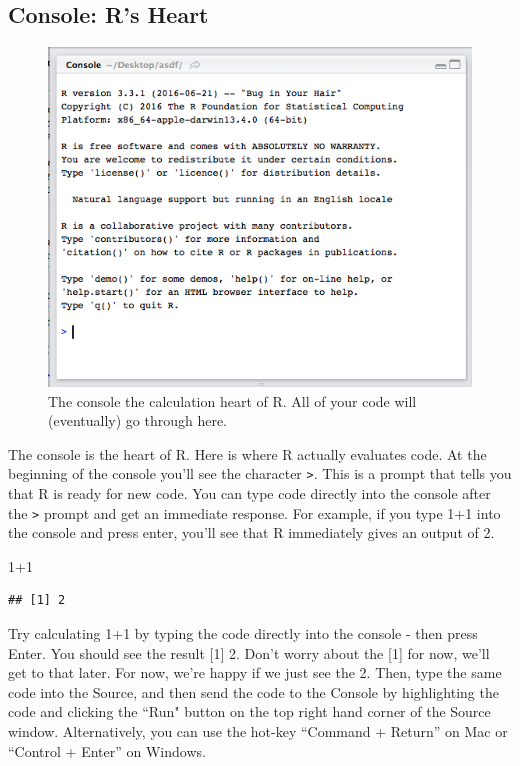 \documentclass[]{book}
\newenvironment{Shaded}{\begin{snugshade}}{\end{snugshade}}
\newcommand{\DecValTok}[1]{\textcolor[rgb]{0.00,0.00,0.81}{{#1}}}
\theoremstyle{definition}
\theoremstyle{definition}
\theoremstyle{remark}
\begin{document}
\subsection{Console: R's Heart}\label{console-rs-heart}

\begin{figure}
\includegraphics[width=600px]{images/consoless} \caption{The console the calculation heart of R. All of your code will (eventually) go through here.}\label{fig:consolewindow}
\end{figure}

The console is the heart of R. Here is where R actually evaluates code.
At the beginning of the console you'll see the character \texttt{>}.
This is a prompt that tells you that R is ready for new code. You can
type code directly into the console after the \texttt{>} prompt and get
an immediate response. For example, if you type 1+1 into the console and
press enter, you'll see that R immediately gives an output of 2.

\begin{Shaded}
\begin{Highlighting}[]
\DecValTok{1+1}
\end{Highlighting}
\end{Shaded}

\begin{verbatim}
## [1] 2
\end{verbatim}

Try calculating 1+1 by typing the code directly into the console - then
press Enter. You should see the result {[}1{]} 2. Don't worry about the
{[}1{]} for now, we'll get to that later. For now, we're happy if we
just see the 2. Then, type the same code into the Source, and then send
the code to the Console by highlighting the code and clicking the ``Run"
button on the top right hand corner of the Source window. Alternatively,
you can use the hot-key ``Command + Return'' on Mac or ``Control +
Enter'' on Windows.
\end{document}
